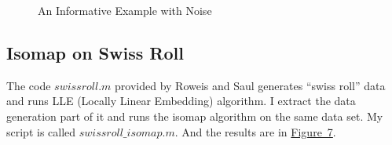 \documentclass{article}
\begin{document}
\begin{figure}
	\centering
	\quad
	\caption{An Informative Example with Noise}
	\label{fig-6}
\end{figure}


\subsection{Isomap on Swiss Roll}
The code $swissroll.m$ provided by Roweis and Saul generates ``swiss roll'' data and runs LLE (Locally Linear Embedding) algorithm. I extract the data generation part of it and runs the isomap algorithm on the same data set. My script is called $swissroll\_isomap.m$. And the results are in \hyperref[fig-7]{Figure~7}.
\end{document}
